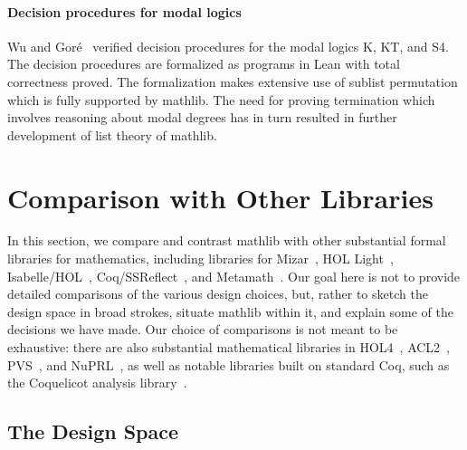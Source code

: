 \documentclass[sigplan]{acmart}\settopmatter{}
\newcommand{\mathlib}{\textsf{mathlib}\xspace}
\begin{document}
\paragraph{Decision procedures for modal logics} Wu and Gor\'e~\cite{Wu19} verified decision procedures for the modal logics K, KT, and S4. The decision procedures are formalized as programs in Lean with total correctness proved. The formalization makes extensive use of sublist permutation which is fully supported by \mathlib. The need for proving termination which involves reasoning about modal degrees has in turn resulted in further development of list theory of \mathlib.

\section{Comparison with Other Libraries}
\label{section:comparison}

In this section, we compare and contrast \mathlib with other substantial formal libraries for mathematics, including libraries for Mizar~\cite{Banc15, Grab10}, HOL Light~\cite{Harr09}, Isabelle/HOL~\cite{Nipk02}, Coq/SSReflect~\cite{Bert04,Mahb17}, and Metamath~\cite{Meg19}.
Our goal here is not to provide detailed comparisons of the various design choices, but, rather to sketch the design space in broad strokes, situate \mathlib within it, and explain some of the decisions we have made.
Our choice of comparisons is not meant to be exhaustive: there are also substantial mathematical libraries in HOL4~\cite{Slin08}, ACL2~\cite{Kau13}, PVS~\cite{Owre92}, and NuPRL~\cite{Const86}, as well as notable libraries built on standard Coq, such as the Coquelicot analysis library~\cite{Bold15}.

\subsection{The Design Space}
\label{subsection:design:space}
\end{document}
